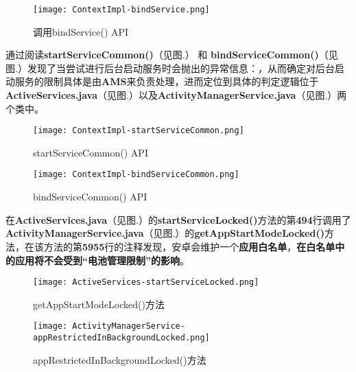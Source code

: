 \begin{figure}[htbp]
	\centering
	\texttt{[image: ContextImpl-bindService.png]} %
	\caption{调用bindService() API}
	\label{fig:source code:bindService}
\end{figure}

通过阅读\textbf{startServiceCommon()}（见图.\redbf{\ref{fig:source code:startServiceCommon}}） 和 \textbf{bindServiceCommon()}（见图.\redbf{\ref{fig:source code:bindServiceCommon}}）发现了当尝试进行后台启动服务时会抛出的异常信息：，从而确定对后台启动服务的限制具体是由\textbf{AMS}来负责处理，进而定位到具体的判定逻辑位于\textbf{ActiveServices.java}（见图.\redbf{\ref{fig:source code:getAppStartModeLocked}}）以及\textbf{ActivityManagerService.java}（见图.\redbf{\ref{fig:source code:appRestrictedInBackgroundLocked}}）两个类中。

\begin{figure}[htbp]
	\centering
	\texttt{[image: ContextImpl-startServiceCommon.png]} %
	\caption{startServiceCommon() API}
	\label{fig:source code:startServiceCommon}
\end{figure}


\begin{figure}[htbp]
	\centering
	\texttt{[image: ContextImpl-bindServiceCommon.png]} %
	\caption{bindServiceCommon() API}
	\label{fig:source code:bindServiceCommon}
\end{figure}

在\textbf{ActiveServices.java}（见图.\redbf{\ref{fig:source code:getAppStartModeLocked}}）的\textbf{startServiceLocked()}方法的第\textbf{494}行调用了\textbf{ActivityManagerService.java}（见图.\redbf{\ref{fig:source code:appRestrictedInBackgroundLocked}}）的\textbf{getAppStartModeLocked()}方法，在该方法的第\textbf{5955}行的注释发现，安卓会维护一个\textbf{应用白名单}，\textbf{在白名单中的应用将不会受到“电池管理限制”的影响}。

\begin{figure}[htbp]
	\centering
	\texttt{[image: ActiveServices-startServiceLocked.png]} %
	\caption{getAppStartModeLocked()方法}
	\label{fig:source code:getAppStartModeLocked}
\end{figure}

\begin{figure}[htbp]
	\centering
	\texttt{[image: ActivityManagerService-appRestrictedInBackgroundLocked.png]} %
	\caption{appRestrictedInBackgroundLocked()方法}
	\label{fig:source code:appRestrictedInBackgroundLocked}
\end{figure}

